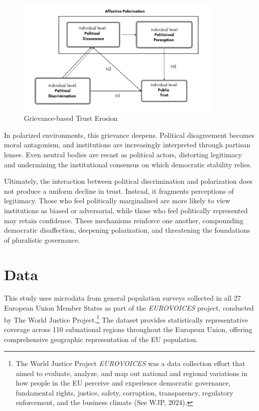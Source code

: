 \documentclass{article}
\begin{document}
\begin{figure}[htbp]
\centering
\caption{Grievance-based Trust Erosion}
\label{fig:0}
\includegraphics[width=0.9\textwidth]{"viz/theoretical_diagram.png"}
\end{figure}

In polarized environments, this grievance deepens. Political disagreement becomes moral antagonism, and institutions are increasingly interpreted through partisan lenses. Even neutral bodies are recast as political actors, distorting legitimacy and undermining the institutional consensus on which democratic stability relies.

Ultimately, the interaction between political discrimination and polarization does not produce a uniform decline in trust. Instead, it fragments perceptions of legitimacy. Those who feel politically marginalized are more likely to view institutions as biased or adversarial, while those who feel politically represented may retain confidence. These mechanisms reinforce one another, compounding democratic disaffection, deepening polarization, and threatening the foundations of pluralistic governance.

\section{Data}

This study uses microdata from general population surveys collected in all 27 European Union Member States as part of the \emph{EUROVOICES} project, conducted by The World Justice Project.\footnote{The World Justice Project \emph{EUROVOICES} was a data collection effort that aimed to evaluate, analyze, and map out national and regional variations in how people in the EU perceive and experience democratic governance, fundamental rights, justice, safety, corruption, transparency, regulatory enforcement, and the business climate (See WJP, 2024).} The dataset provides statistically representative coverage across 110 subnational regions throughout the European Union, offering comprehensive geographic representation of the EU population.
\end{document}
